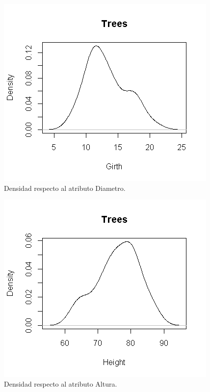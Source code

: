 \documentclass[12pt,a4paper]{article}
\begin{document}
\begin{figure}
\centering
\includegraphics[scale=0.9]{Densidad1}
\caption{ Densidad respecto al atributo Diametro.}
\end{figure}

\begin{figure}
\centering
\includegraphics[scale=0.9]{Densidad2}
\caption{ Densidad respecto al atributo Altura.}
\end{figure}
\end{document}
